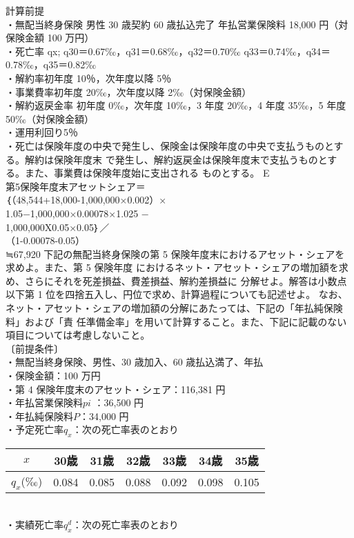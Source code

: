 \documentclass[report,gutter=10mm,fore-edge=10mm,uplatex,dvipdfmx]{jlreq}
\begin{document}
\noindent
計算前提\\
・無配当終身保険 男性
30 歳契約 60 歳払込完了
年払営業保険料 18,000 円（対保険金額 100 万円）\\
・死亡率 qx; q30＝0.67‰，q31＝0.68‰，q32＝0.70‰ q33＝0.74‰，q34＝0.78‰，q35＝0.82‰\\
・解約率初年度 10％，次年度以降 5％\\
・事業費率初年度 20‰，次年度以降 2‰（対保険金額）\\
・解約返戻金率 初年度 0‰，次年度 10‰，3 年度 20‰，4 年度 35‰，5 年度 50‰（対保険金額）\\
・運用利回り5％\\
・死亡は保険年度の中央で発生し、保険金は保険年度の中央で支払うものとする。解約は保険年度末
で発生し、解約返戻金は保険年度末で支払うものとする。また、事業費は保険年度始に支出される
ものとする。
\answer{}
E\\
第5保険年度末アセットシェア＝\\
｛（48,544+18,000-1,000,000×0.002）×\\
1.05−1,000,000×0.00078×1.025 −\\
1,000,000X0.05×0.05｝／\\
（1-0.00078-0.05）\\
≒67,920
下記の無配当終身保険の第 5 保険年度末におけるアセット・シェアを求めよ。また、第 5 保険年度
におけるネット・アセット・シェアの増加額を求め、さらにそれを死差損益、費差損益、解約差損益に
分解せよ。解答は小数点以下第 1 位を四捨五入し、円位で求め、計算過程についても記述せよ。
なお、ネット・アセット・シェアの増加額の分解にあたっては、下記の「年払純保険料」および「責
任準備金率」を用いて計算すること。また、下記に記載のない項目については考慮しないこと。\\
〔前提条件〕\\
・無配当終身保険、男性、30 歳加入、60 歳払込満了、年払\\
・保険金額：100 万円\\
・第 4 保険年度末のアセット・シェア：116,381 円\\
・年払営業保険料$pi$ ：36,500 円\\
・年払純保険料$P$：34,000 円\\
・予定死亡率$q_x$：次の死亡率表のとおり

\begin{tabular}{|c|c|c|c|c|c|c|}
\hline
 $x$& 30歳& 31歳& 32歳& 33歳& 34歳& 35歳\\\hline
 $q_x$(‰)& 0.084& 0.085& 0.088& 0.092& 0.098& 0.105\\ \hline
\end{tabular}\\
・実績死亡率$q^d_x$：次の死亡率表のとおり
\end{document}
